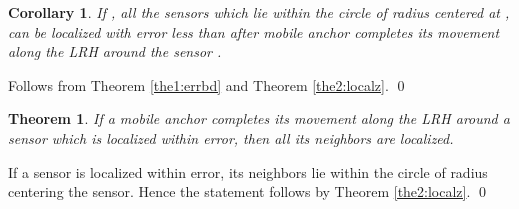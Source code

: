 \documentclass[preprint,11pt]{elsarticle}
\newtheorem{theorem}{Theorem}
\newtheorem{corollary}{Corollary}
\newenvironment{proof}{\noindent{\bf Proof: }}{\qed \smallbreak}
\begin{document}
\begin{corollary}
\label{cor:cor}
If , all the sensors which lie within the circle of radius  centered at ,
can be localized with error less than  after mobile anchor completes its movement along the LRH around the sensor .
\end{corollary}
\begin{proof}
Follows from Theorem \ref{the1:errbd} and Theorem \ref{the2:localz}.
\end{proof}

\begin{theorem}
\label{thm3:nbrslclztn}
If a mobile anchor completes its movement along the LRH around a sensor which is localized within  error, then all its neighbors
are localized.
\end{theorem}
\begin{proof}
If  a sensor is localized within  error, its neighbors lie within the circle of radius  centering the sensor.
Hence the statement follows by Theorem \ref{the2:localz}.
\end{proof}
\end{document}
